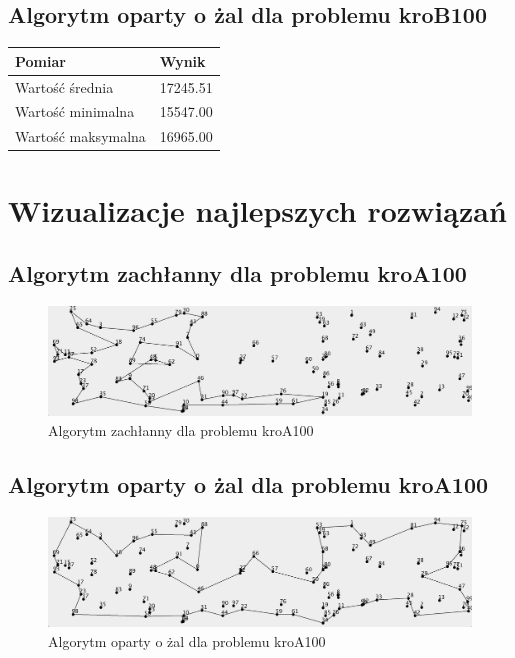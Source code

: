 \documentclass[a4paper]{article}
\begin{document}
\subsection{Algorytm oparty o żal dla problemu kroB100}

\begin{center}
	\begin{tabular}{ l | l }
		\textbf{Pomiar} & \textbf{Wynik} \\
		\hline
		Wartość średnia    & 17245.51 \\
		Wartość minimalna  & 15547.00 \\
		Wartość maksymalna & 16965.00 \\
	\end{tabular}
\end{center}

\section{Wizualizacje najlepszych rozwiązań}

\subsection{Algorytm zachłanny dla problemu kroA100}

\begin{figure}[H]
\centering
\includegraphics[width=\textwidth]{kroA_greedy}
\caption{Algorytm zachłanny dla problemu kroA100}
\end{figure}

\subsection{Algorytm oparty o żal dla problemu kroA100}

\begin{figure}[H]
\centering
\includegraphics[width=\textwidth]{kroA_regret}
\caption{Algorytm oparty o żal dla problemu kroA100}
\end{figure}
\end{document}
